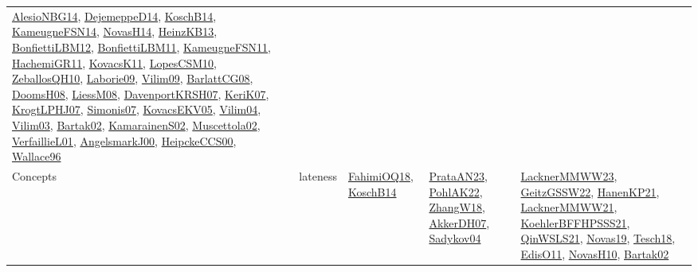 {\begin{longtable}{llp{6cm}p{6cm}p{6cm}}
\href{papers/AlesioNBG14.pdf}{AlesioNBG14}\cite{AlesioNBG14}, \href{papers/DejemeppeD14.pdf}{DejemeppeD14}\cite{DejemeppeD14}, \href{papers/KoschB14.pdf}{KoschB14}\cite{KoschB14}, \href{articles/KameugneFSN14.pdf}{KameugneFSN14}\cite{KameugneFSN14}, \href{articles/NovasH14.pdf}{NovasH14}\cite{NovasH14}, \href{papers/HeinzKB13.pdf}{HeinzKB13}\cite{HeinzKB13}, \href{papers/BonfiettiLBM12.pdf}{BonfiettiLBM12}\cite{BonfiettiLBM12}, \href{papers/BonfiettiLBM11.pdf}{BonfiettiLBM11}\cite{BonfiettiLBM11}, \href{papers/KameugneFSN11.pdf}{KameugneFSN11}\cite{KameugneFSN11}, \href{articles/HachemiGR11.pdf}{HachemiGR11}\cite{HachemiGR11}, \href{articles/KovacsK11.pdf}{KovacsK11}\cite{KovacsK11}, \href{articles/LopesCSM10.pdf}{LopesCSM10}\cite{LopesCSM10}, \href{articles/ZeballosQH10.pdf}{ZeballosQH10}\cite{ZeballosQH10}, \href{papers/Laborie09.pdf}{Laborie09}\cite{Laborie09}, \href{papers/Vilim09.pdf}{Vilim09}\cite{Vilim09}, \href{papers/BarlattCG08.pdf}{BarlattCG08}\cite{BarlattCG08}, \href{papers/DoomsH08.pdf}{DoomsH08}\cite{DoomsH08}, \href{articles/LiessM08.pdf}{LiessM08}\cite{LiessM08}, \href{papers/DavenportKRSH07.pdf}{DavenportKRSH07}\cite{DavenportKRSH07}, \href{papers/KeriK07.pdf}{KeriK07}\cite{KeriK07}, \href{papers/KrogtLPHJ07.pdf}{KrogtLPHJ07}\cite{KrogtLPHJ07}, \href{articles/Simonis07.pdf}{Simonis07}\cite{Simonis07}, \href{papers/KovacsEKV05.pdf}{KovacsEKV05}\cite{KovacsEKV05}, \href{papers/Vilim04.pdf}{Vilim04}\cite{Vilim04}, \href{papers/Vilim03.pdf}{Vilim03}\cite{Vilim03}, \href{papers/Bartak02.pdf}{Bartak02}\cite{Bartak02}, \href{papers/KamarainenS02.pdf}{KamarainenS02}\cite{KamarainenS02}, \href{papers/Muscettola02.pdf}{Muscettola02}\cite{Muscettola02}, \href{papers/VerfaillieL01.pdf}{VerfaillieL01}\cite{VerfaillieL01}, \href{papers/AngelsmarkJ00.pdf}{AngelsmarkJ00}\cite{AngelsmarkJ00}, \href{articles/HeipckeCCS00.pdf}{HeipckeCCS00}\cite{HeipckeCCS00}, \href{articles/Wallace96.pdf}{Wallace96}\cite{Wallace96}\\
Concepts & lateness & \href{articles/FahimiOQ18.pdf}{FahimiOQ18}\cite{FahimiOQ18}, \href{papers/KoschB14.pdf}{KoschB14}\cite{KoschB14} & \href{articles/PrataAN23.pdf}{PrataAN23}\cite{PrataAN23}, \href{articles/PohlAK22.pdf}{PohlAK22}\cite{PohlAK22}, \href{articles/ZhangW18.pdf}{ZhangW18}\cite{ZhangW18}, \href{papers/AkkerDH07.pdf}{AkkerDH07}\cite{AkkerDH07}, \href{papers/Sadykov04.pdf}{Sadykov04}\cite{Sadykov04} & \href{articles/LacknerMMWW23.pdf}{LacknerMMWW23}\cite{LacknerMMWW23}, \href{papers/GeitzGSSW22.pdf}{GeitzGSSW22}\cite{GeitzGSSW22}, \href{papers/HanenKP21.pdf}{HanenKP21}\cite{HanenKP21}, \href{papers/LacknerMMWW21.pdf}{LacknerMMWW21}\cite{LacknerMMWW21}, \href{articles/KoehlerBFFHPSSS21.pdf}{KoehlerBFFHPSSS21}\cite{KoehlerBFFHPSSS21}, \href{articles/QinWSLS21.pdf}{QinWSLS21}\cite{QinWSLS21}, \href{articles/Novas19.pdf}{Novas19}\cite{Novas19}, \href{papers/Tesch18.pdf}{Tesch18}\cite{Tesch18}, \href{papers/EdisO11.pdf}{EdisO11}\cite{EdisO11}, \href{articles/NovasH10.pdf}{NovasH10}\cite{NovasH10}, \href{papers/Bartak02.pdf}{Bartak02}\cite{Bartak02}\\

\end{longtable}}
